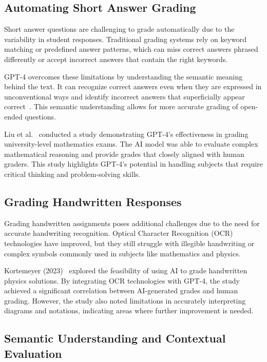 \documentclass[ms,twoside,print]{nuthesis}
\begin{document}
\subsection{Automating Short Answer Grading}

Short answer questions are challenging to grade automatically due to the variability in student responses. Traditional grading systems rely on keyword matching or predefined answer patterns, which can miss correct answers phrased differently or accept incorrect answers that contain the right keywords.

GPT-4 overcomes these limitations by understanding the semantic meaning behind the text. It can recognize correct answers even when they are expressed in unconventional ways and identify incorrect answers that superficially appear correct~\cite{Liu2023}. This semantic understanding allows for more accurate grading of open-ended questions.

Liu et al.~\cite{Liu2023} conducted a study demonstrating GPT-4's effectiveness in grading university-level mathematics exams. The AI model was able to evaluate complex mathematical reasoning and provide grades that closely aligned with human graders. This study highlights GPT-4's potential in handling subjects that require critical thinking and problem-solving skills.

\subsection{Grading Handwritten Responses}

Grading handwritten assignments poses additional challenges due to the need for accurate handwriting recognition. Optical Character Recognition (OCR) technologies have improved, but they still struggle with illegible handwriting or complex symbols commonly used in subjects like mathematics and physics.

Kortemeyer (2023)~\cite{Kortemeyer2023} explored the feasibility of using AI to grade handwritten physics solutions. By integrating OCR technologies with GPT-4, the study achieved a significant correlation between AI-generated grades and human grading. However, the study also noted limitations in accurately interpreting diagrams and notations, indicating areas where further improvement is needed.

\subsection{Semantic Understanding and Contextual Evaluation}
\end{document}
